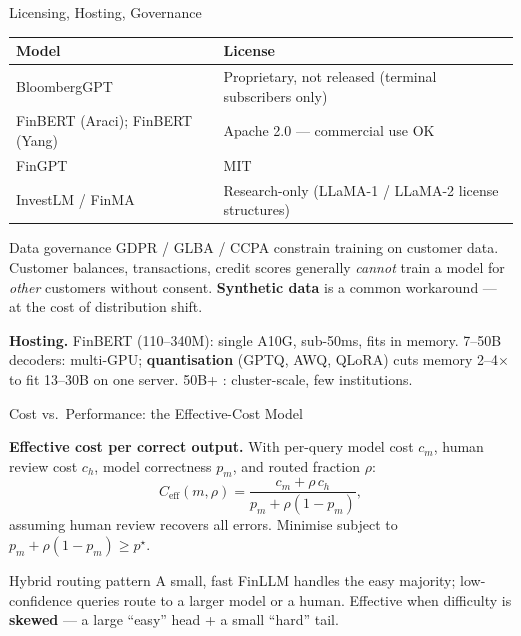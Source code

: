 \documentclass[9pt,t]{beamer}
\begin{document}
\begin{frame}{Licensing, Hosting, Governance}
\small
\begin{tabular}{ll}
\toprule
\textbf{Model} & \textbf{License} \\
\midrule
BloombergGPT & Proprietary, not released (terminal subscribers only) \\
FinBERT (Araci); FinBERT (Yang) & Apache 2.0 --- commercial use OK \\
FinGPT & MIT \\
InvestLM / FinMA & Research-only (LLaMA-1 / LLaMA-2 license structures) \\
\bottomrule
\end{tabular}

\medskip
\begin{block}{Data governance}
GDPR / GLBA / CCPA constrain training on customer data. Customer balances,
transactions, credit scores generally \emph{cannot} train a model for \emph{other}
customers without consent. \textbf{Synthetic data} is a common workaround --- at the
cost of distribution shift.
\end{block}

\medskip
\textbf{Hosting.} FinBERT (110--340M): single A10G, sub-50ms, fits in memory.
7--50B decoders: multi-GPU; \textbf{quantisation} (GPTQ, AWQ, QLoRA) cuts memory
2--4$\times$ to fit 13--30B on one server. 50B+ : cluster-scale, few institutions.
\end{frame}

\begin{frame}{Cost vs.\ Performance: the Effective-Cost Model}
\begin{underhood}
\textbf{Effective cost per correct output.} With per-query model cost $c_m$, human
review cost $c_h$, model correctness $p_m$, and routed fraction $\rho$:
\[
  C_{\text{eff}}(m,\rho) = \frac{c_m + \rho\,c_h}{p_m + \rho(1-p_m)},
\]
assuming human review recovers all errors. Minimise subject to
$p_m + \rho(1-p_m) \ge p^\star$.
\end{underhood}

\medskip
\begin{block}{Hybrid routing pattern}
A small, fast FinLLM handles the easy majority; low-confidence queries route to a
larger model or a human. Effective when difficulty is \textbf{skewed} --- a large
``easy'' head + a small ``hard'' tail.
\end{block}
\end{frame}
\end{document}
